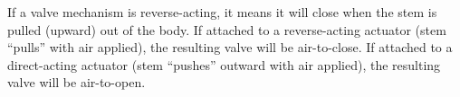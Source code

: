 If a valve mechanism is reverse-acting, it means it will close when the stem is pulled (upward) out of the body.  If attached to a reverse-acting actuator (stem ``pulls'' with air applied), the resulting valve will be air-to-close.  If attached to a direct-acting actuator (stem ``pushes'' outward with air applied), the resulting valve will be air-to-open.




